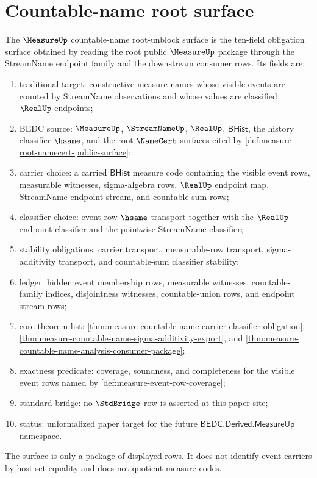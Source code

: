 \section{Countable-name root surface}
\label{sec:measure-countable-name-root-unblock}

\begin{definition}
\label{def:measure-countable-name-root-unblock-surface}
The $\MeasureUp$ countable-name root-unblock surface is the ten-field
obligation surface obtained by reading the root public $\MeasureUp$ package
through the StreamName endpoint family and the downstream consumer rows. Its
fields are:
\begin{enumerate}
  \item traditional target: constructive measure names whose visible events
  are counted by StreamName observations and whose values are classified
  $\RealUp$ endpoints;
  \item BEDC source: $\MeasureUp$, $\StreamNameUp$, $\RealUp$,
  $\mathsf{BHist}$, the history classifier $\hsame$, and the root
  $\NameCert$ surfaces cited by \autoref{def:measure-root-namecert-public-surface};
  \item carrier choice: a carried $\mathsf{BHist}$ measure code containing
  the visible event rows, measurable witnesses, sigma-algebra rows,
  $\RealUp$ endpoint map, StreamName endpoint stream, and countable-sum rows;
  \item classifier choice: event-row $\hsame$ transport together with the
  $\RealUp$ endpoint classifier and the pointwise StreamName classifier;
  \item stability obligations: carrier transport, measurable-row transport,
  sigma-additivity transport, and countable-sum classifier stability;
  \item ledger: hidden event membership rows, measurable witnesses,
  countable-family indices, disjointness witnesses, countable-union rows, and
  endpoint stream rows;
  \item core theorem list:
  \autoref{thm:measure-countable-name-carrier-classifier-obligation},
  \autoref{thm:measure-countable-name-sigma-additivity-export}, and
  \autoref{thm:measure-countable-name-analysis-consumer-package};
  \item exactness predicate: coverage, soundness, and completeness for the
  visible event rows named by \autoref{def:measure-event-row-coverage};
  \item standard bridge: no $\StdBridge$ row is asserted at this paper site;
  \item status: unformalized paper target for the future
  $\mathsf{BEDC.Derived.MeasureUp}$ namespace.
\end{enumerate}
The surface is only a package of displayed rows. It does not identify event
carriers by host set equality and does not quotient measure codes.
\end{definition}

